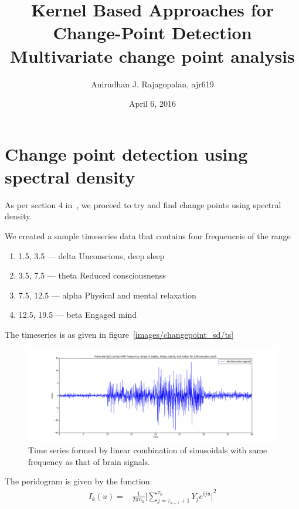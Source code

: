 \documentclass{article}
\begin{document}
\title{Kernel Based Approaches for Change-Point Detection\\ Multivariate change point analysis}
\date{April 6, 2016}
\author{Anirudhan J. Rajagopalan, ajr619}

\maketitle

\newpage
\section{Change point detection using spectral density}
As per section 4 in~\cite{lavielle2005using}, we proceed to try and find change points using spectral density.

We created a sample timeseries data that contains four frequenceis of the range 
\begin{enumerate}
  \item 1.5, 3.5 --- delta Unconscious, deep sleep
  \item 3.5, 7.5 --- theta Reduced consciousnenss
  \item 7.5, 12.5 --- alpha Physical and mental relaxation
  \item 12.5, 19.5 --- beta Engaged mind
\end{enumerate}

The timeseries is as given in figure~\ref{images/changepoint_sd/ts}
\begin{figure}[ht!]
  \centering
  \includegraphics[width=1\textwidth]{images/changepoint_sd/ts}
  \caption{Time series formed by linear combination of sinusoidals with same frequency as that of brain signals.\label{fig:cp_sd_ts}}
\end{figure}

The peridogram is given by the function:
\begin{align}
  I_{k}(u) =& \frac{1}{2\pi n_{k}} {\lvert \sum_{j=\tau_{k-1}+1}^{\tau_{k}} Y_{j}e^{iju} \rvert}^{2}
\end{align}
\end{document}
